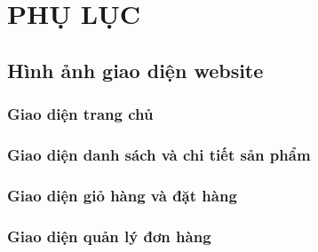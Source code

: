 \chapter*{PHỤ LỤC}\label{phuluc_intro}
\vspace{-40pt}
\renewcommand{\thesection}{\arabic{section}} %
\setcounter{section}{0}
\section{Hình ảnh giao diện website}
\subsection{Giao diện trang chủ}
\subsection{Giao diện danh sách và chi tiết sản phẩm}
\subsection{Giao diện giỏ hàng và đặt hàng}
\subsection{Giao diện quản lý đơn hàng}